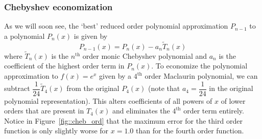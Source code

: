 \documentclass[11pt]{article}
\begin{document}
\subsubsection{Chebyshev economization}
As we will soon see, the `best' reduced order polynomial approximation \(P_{n-1}\) to a polynomial \(P_n(x)\) is given by \[P_{n-1}(x) = P_{n}(x) - a_n\tilde T_n(x)\] where \(\tilde T_n(x)\) is the \(n^\text{th}\) order monic Chebyshev polynomial and \(a_n\) is the coefficient of the highest order term in \(P_n(x)\).  To economize the polynomial approximation to \(f(x) = e^x\) given by a \(4^\text{th}\) order Maclaurin polynomial, we can subtract \(\dfrac{1}{24}\tilde T_4(x)\) from the original \(P_4(x)\) (note that \(a_4=\dfrac{1}{24}\) in the original polynomial representation).  This alters coefficients of all powers of \(x\)  of lower orders that are present in \(T_4(x)\) and eliminates the \(4^\text{th}\) order term entirely. Notice in Figure~\ref{fig::cheb_ord} that the maximum error for the third order function is only slightly worse for \(x=1.0\) than for the fourth order function.
\end{document}
